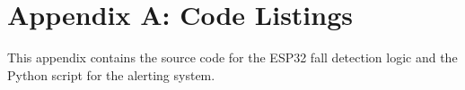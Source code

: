 \chapter{Appendix A: Code Listings}
This appendix contains the source code for the ESP32 fall detection logic and the Python script for the alerting system.
